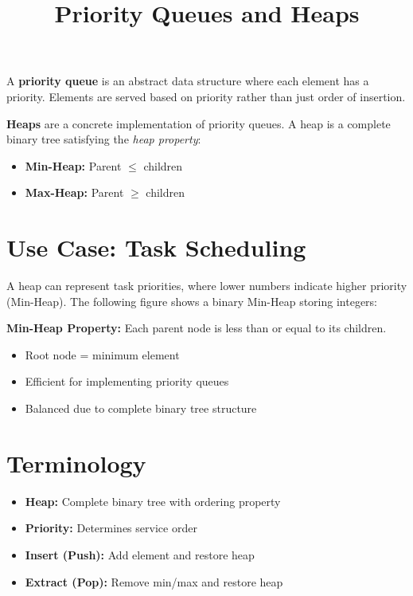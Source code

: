 \documentclass{article}
\title{Priority Queues and Heaps}
\author{}
\date{}
\begin{document}
\maketitle


A \textbf{priority queue} is an abstract data structure where each element has a priority. Elements are served based on priority rather than just order of insertion.

\textbf{Heaps} are a concrete implementation of priority queues. A heap is a complete binary tree satisfying the \textit{heap property}:
\begin{itemize}
  \item \textbf{Min-Heap:} Parent $\leq$ children
  \item \textbf{Max-Heap:} Parent $\geq$ children
\end{itemize}

\section{Use Case: Task Scheduling}

A heap can represent task priorities, where lower numbers indicate higher priority (Min-Heap). The following figure shows a binary Min-Heap storing integers:

\begin{center}
\end{center}

\textbf{Min-Heap Property:} Each parent node is less than or equal to its children.

\begin{itemize}
  \item Root node = minimum element
  \item Efficient for implementing priority queues
  \item Balanced due to complete binary tree structure
\end{itemize}

\section{Terminology}
\begin{itemize}
  \item \textbf{Heap:} Complete binary tree with ordering property
  \item \textbf{Priority:} Determines service order
  \item \textbf{Insert (Push):} Add element and restore heap
  \item \textbf{Extract (Pop):} Remove min/max and restore heap
\end{itemize}
\end{document}
